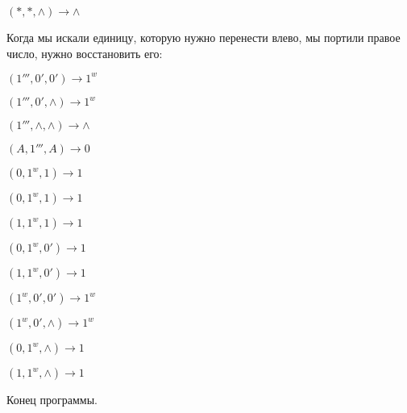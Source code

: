\documentclass[12pt,a4paper]{article}
\begin{document}
$(*,*,\wedge)\to \wedge$

Когда мы искали единицу, которую нужно перенести влево, мы портили правое число, нужно восстановить его:

$(1''',0',0')\to 1^w$

$(1''',0',\wedge)\to 1^w$

$(1''',\wedge,\wedge)\to \wedge$

$(A,1''',A)\to 0$

$(0,1^w,1)\to 1$

$(0,1^w,1)\to 1$

$(1,1^w,1)\to 1$

$(0,1^w,0')\to 1$

$(1,1^w,0')\to 1$

$(1^w,0',0')\to 1^w$

$(1^w,0',\wedge)\to 1^w$

$(0,1^w,\wedge)\to 1$

$(1,1^w,\wedge)\to 1$

Конец программы.
\end{document}
